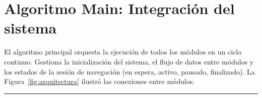 \section{Algoritmo Main: Integración del sistema}

El algoritmo principal orquesta la ejecución de todos los módulos en un ciclo continuo.
Gestiona la inicialización del sistema, el flujo de datos entre módulos y los estados
de la sesión de navegación (en espera, activo, pausado, finalizado). La
Figura~\ref{fig:arquitectura} ilustró las conexiones entre módulos.

\begin{center}
\label{alg:main}
\end{center}
\vspace{-1.8cm}
\rule{\textwidth}{0.4pt}
\vspace{-0.9cm}
